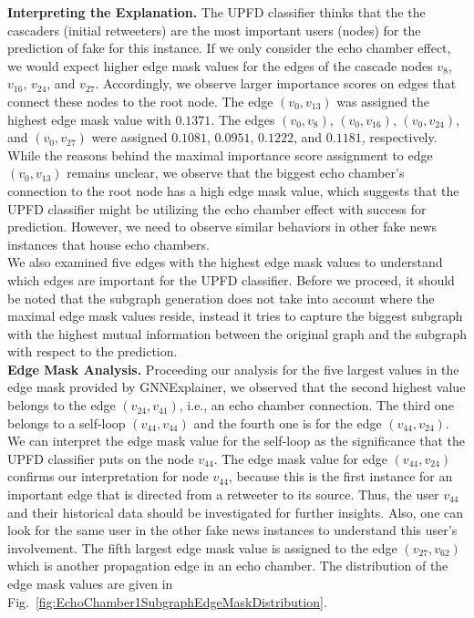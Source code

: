 \textbf{Interpreting the Explanation.} The UPFD classifier thinks that the the cascaders (initial retweeters) are the most important users (nodes) for the prediction of fake for this instance. If we only consider the echo chamber effect, we would expect higher edge mask values for the edges of the cascade nodes $v_8$, $v_{16}$, $v_{24}$, and $v_{27}$. Accordingly, we observe larger importance scores on edges that connect these nodes to the root node. The edge $(v_0, v_{13})$ was assigned the highest edge mask value with $0.1371$. The edges $(v_0, v_8)$, $(v_0, v_{16})$, $(v_0, v_{24})$, and $(v_0, v_{27})$ were assigned $0.1081$, $0.0951$, $0.1222$, and $0.1181$, respectively.  While the reasons behind the maximal importance score assignment to edge $(v_0, v_{13})$ remains unclear, we observe that the biggest echo chamber's connection to the root node has a high edge mask value, which suggests that the UPFD classifier might be utilizing the echo chamber effect with success for prediction. However, we need to observe similar behaviors in other fake news instances that house echo chambers.\\
We also examined five edges with the highest edge mask values to understand which edges are important for the UPFD classifier. Before we proceed, it should be noted that the subgraph generation does not take into account where the maximal edge mask values reside, instead it tries to capture the biggest subgraph with the highest mutual information between the original graph and the subgraph with respect to the prediction.\\
\textbf{Edge Mask Analysis.} Proceeding our analysis for the five largest values in the edge mask provided by GNNExplainer, we observed that the second highest value belongs to the edge $(v_{24}, v_{41})$, i.e., an echo chamber connection. The third one belongs to a self-loop $(v_{44}, v_{44})$ and the fourth one is for the edge $(v_{44}, v_{24})$. We can interpret the edge mask value for the self-loop as the significance that the UPFD classifier puts on the node $v_{44}$. The edge mask value for edge $(v_{44}, v_{24})$ confirms our interpretation for node $v_{44}$, because this is the first instance for an important edge that is directed from a retweeter to its source. Thus, the user $v_{44}$ and their historical data should be investigated for further insights. Also, one can look for the same user in the other fake news instances to understand this user's involvement. The fifth largest edge mask value is assigned to the edge $(v_{27}, v_{62})$ which is another propagation edge in an echo chamber. The distribution of the edge mask values are given in Fig.~\ref{fig:EchoChamber1SubgraphEdgeMaskDistribution}.\\

